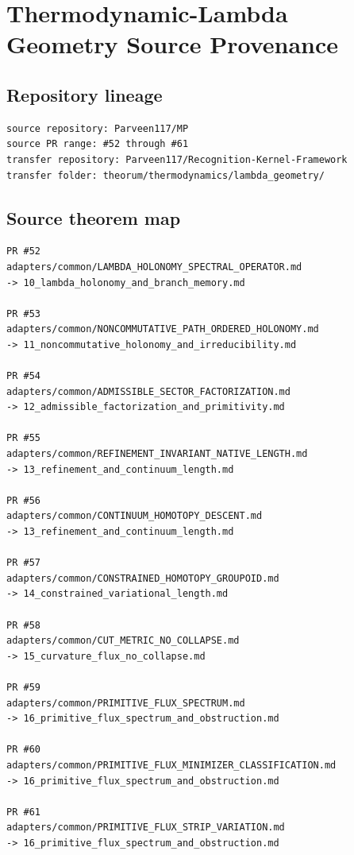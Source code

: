 \hypertarget{thermodynamic-lambda-geometry-source-provenance}{%
\chapter{Thermodynamic-Lambda Geometry Source Provenance}\label{thermodynamic-lambda-geometry-source-provenance}}

\hypertarget{repository-lineage}{%
\section{Repository lineage}\label{repository-lineage}}

\begin{verbatim}
source repository: Parveen117/MP
source PR range: #52 through #61
transfer repository: Parveen117/Recognition-Kernel-Framework
transfer folder: theorum/thermodynamics/lambda_geometry/
\end{verbatim}

\hypertarget{source-theorem-map}{%
\section{Source theorem map}\label{source-theorem-map}}

\begin{verbatim}
PR #52
adapters/common/LAMBDA_HOLONOMY_SPECTRAL_OPERATOR.md
-> 10_lambda_holonomy_and_branch_memory.md

PR #53
adapters/common/NONCOMMUTATIVE_PATH_ORDERED_HOLONOMY.md
-> 11_noncommutative_holonomy_and_irreducibility.md

PR #54
adapters/common/ADMISSIBLE_SECTOR_FACTORIZATION.md
-> 12_admissible_factorization_and_primitivity.md

PR #55
adapters/common/REFINEMENT_INVARIANT_NATIVE_LENGTH.md
-> 13_refinement_and_continuum_length.md

PR #56
adapters/common/CONTINUUM_HOMOTOPY_DESCENT.md
-> 13_refinement_and_continuum_length.md

PR #57
adapters/common/CONSTRAINED_HOMOTOPY_GROUPOID.md
-> 14_constrained_variational_length.md

PR #58
adapters/common/CUT_METRIC_NO_COLLAPSE.md
-> 15_curvature_flux_no_collapse.md

PR #59
adapters/common/PRIMITIVE_FLUX_SPECTRUM.md
-> 16_primitive_flux_spectrum_and_obstruction.md

PR #60
adapters/common/PRIMITIVE_FLUX_MINIMIZER_CLASSIFICATION.md
-> 16_primitive_flux_spectrum_and_obstruction.md

PR #61
adapters/common/PRIMITIVE_FLUX_STRIP_VARIATION.md
-> 16_primitive_flux_spectrum_and_obstruction.md
\end{verbatim}

